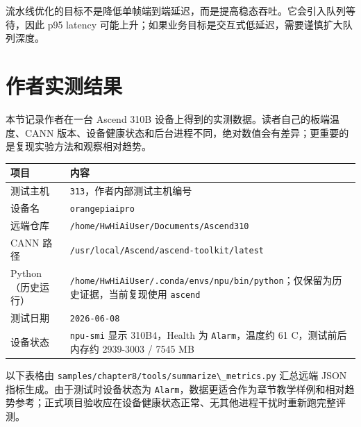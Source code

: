 流水线优化的目标不是降低单帧端到端延迟，而是提高稳态吞吐。它会引入队列等待，因此
p95 latency 可能上升；如果业务目标是交互式低延迟，需要谨慎扩大队列深度。

\section{作者实测结果}\label{src-book-chapter8-h15}

本节记录作者在一台 Ascend 310B
设备上得到的实测数据。读者自己的板端温度、CANN
版本、设备健康状态和后台进程不同，绝对数值会有差异；更重要的是复现实验方法和观察相对趋势。

\begin{longtable}[]{@{}
  >{\raggedright\arraybackslash}p{}
  >{\raggedright\arraybackslash}p{}@{}}
\toprule\noalign{}
\begin{minipage}[b]{\linewidth}\raggedright
项目
\end{minipage} & \begin{minipage}[b]{\linewidth}\raggedright
内容
\end{minipage} \\
\midrule\noalign{}
\endhead
\bottomrule\noalign{}
\endlastfoot
测试主机 & \passthrough{\lstinline!313!}，作者内部测试主机编号 \\
设备名 & \passthrough{\lstinline!orangepiaipro!} \\
远端仓库 &
\passthrough{\lstinline!/home/HwHiAiUser/Documents/Ascend310!} \\
CANN 路径 &
\passthrough{\lstinline!/usr/local/Ascend/ascend-toolkit/latest!} \\
Python（历史运行） &
\passthrough{\lstinline!/home/HwHiAiUser/.conda/envs/npu/bin/python!}；仅保留为历史证据，当前复现使用
\passthrough{\lstinline!ascend!} \\
测试日期 & \passthrough{\lstinline!2026-06-08!} \\
设备状态 & \passthrough{\lstinline!npu-smi!} 显示 310B4，Health 为
\passthrough{\lstinline!Alarm!}，温度约 61 C，测试前后内存约 2939-3003 /
7545 MB \\
\end{longtable}

以下表格由
\passthrough{\lstinline!samples/chapter8/tools/summarize\_metrics.py!}
汇总远端 JSON 指标生成。由于测试时设备状态为
\passthrough{\lstinline!Alarm!}，数据更适合作为章节教学样例和相对趋势参考；正式项目验收应在设备健康状态正常、无其他进程干扰时重新跑完整评测。

